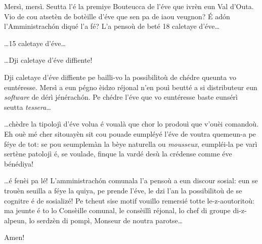 \begin{drama}

\Seunteuccospeaks Mersì, mersì. Seutta l'é la premiye Bouteucca de l'éve que ivrèn eun Val d'Outa. Vio de cou atsetèn de botèille d'éve que sen pa de iaou veugnon? \'E ad\'on l’Amministrach\'on diqué l’a fé? L'a pensoù de beté 18 caletaye d’éve\ldots


\Seunteuccospeaks \ldots 15 caletaye d’éve\ldots


\Seunteuccospeaks \ldots Dji caletaye d’éve
 diffiente!
 
 
\Seunteuccospeaks  Dji caletaye d’éve
 diffiente pe bailli-vo la possibilitoù de chédre queunta vo euntéresse. Mersì a eun pégno èidzo réjonal n'en pouì beutté a si distributeur eun \textit{software} de dérì jénérach\'on. Pe chédre l'éve que vo euntéresse baste eunsérì  seutta \textit{tessera}\ldots
 
 
\Seunteuccospeaks \ldots  chèdre la tipolojì d’éve volua é voualà que chor lo prodouì que v'ouèi comandoù. Eh ouè mé cher sitouayèn sit cou pouade eumpléyé l'éve de voutra quemeun-a pe féye de tot: se pou seumplemàn la bèye naturella ou \textit{mousseux}, eumpléi-la pe varì sertène patolojì é, se voulade, finque la vardé desù la crédense comme éve bénédiya!


\Seunteuccospeaks \ldots é fenèi pa lé! L’amministrach\'on comunala l’a pensoù a eun discour sosial: eun se trouèn seuilla a féye la quiya, pe prende l’éve, le dzi l’an la possibilitoù de se cognitre é de sosializé! Pe tcheut sise motif vouillo remersié totte le-z-aoutoritoù: ma jeunte é to lo Consèille comunal, le consèillì réjonal, lo chef di groupe di-z-alpeun, lo serdzèn di pompì, Monseur de noutra parotse\ldots

\Donspeaks {} Amen! \stufo



\end{drama}
